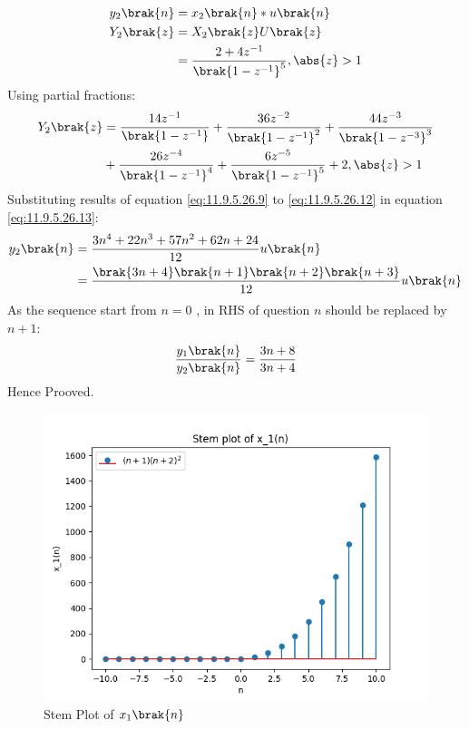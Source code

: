 \documentclass[journal,12pt,twocolumn]{IEEEtran}
\theoremstyle{remark}
\begin{document}
\begin{enumerate}[label=\arabic*.]
\begin{align}
    y_2\brak{n} &= x_2\brak{n}\ast u\brak{n}\\
    Y_2\brak{z} &= X_2\brak{z} U\brak{z} \\
 &=\frac{2+4z^{-1}}{\brak{1-z^{-1}}^5} ,   \abs{z} >1 
\end{align}
Using partial fractions:
\begin{align}
    Y_2\brak{z} &= \frac{14z^{-1}}{\brak{1-z^{-1}}} + \frac{36z^{-2}}{\brak{1-z^{-1}}^2} + \frac{44z^{-3}}{\brak{1-z^{-3}}^3} \label{eq:11.9.5.26.13}\\
    &+ \frac{26z^{-4}}{\brak{1-z^{-1}}^4}+\frac{6z^{-5}}{\brak{1-z^{-1}}^5}+2 , \abs{z}>1\notag 
\end{align}
Substituting results of equation \eqref{eq:11.9.5.26.9} to \eqref{eq:11.9.5.26.12} in equation \eqref{eq:11.9.5.26.13}:
\begin{align}
    y_2\brak{n} &=  \frac{3n^4 + 22n^3 + 57n^2 + 62n + 24}{12}u\brak{n}\\
                &= \frac{\brak{3n+4}\brak{n+1}\brak{n+2}\brak{n+3}}{12}u\brak{n}
\end{align}
As the sequence start from $n=0$ , in RHS of question $n$ should be replaced by $n+1$:
\begin{align}
    \frac{y_1\brak{n}}{y_2\brak{n}} = \frac{3n+8}{3n+4}
\end{align}
Hence Prooved.
\end{enumerate}
\begin{figure}[htbp]
    \centering
    \includegraphics[width=1\columnwidth]{ncert-maths/11/9/5/26/figs/x1_plot.png}
    \caption{Stem Plot of $x_1\brak{n}$}
    \label{fig:x1}
\end{figure}
\end{document}
